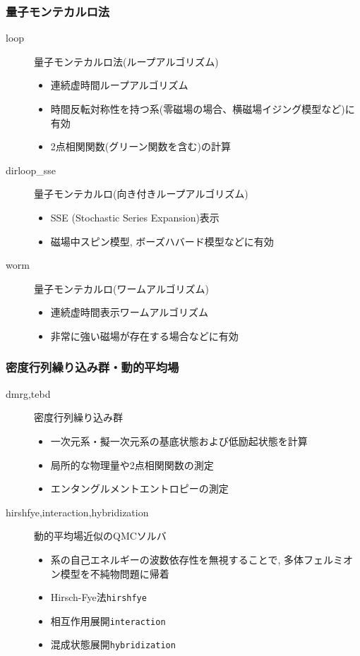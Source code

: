 \begin{frame}
  \frametitle{量子モンテカルロ法}
  \begin{description}
  \item[loop] 量子モンテカルロ法(ループアルゴリズム)
    \begin{itemize}
      \item 連続虚時間ループアルゴリズム
      \item 時間反転対称性を持つ系(零磁場の場合、横磁場イジング模型など)に有効
      \item 2点相関関数(グリーン関数を含む)の計算
    \end{itemize}
  \item[dirloop\_sse] 量子モンテカルロ(向き付きループアルゴリズム)
    \begin{itemize}
      \item SSE (Stochastic Series Expansion)表示
      \item 磁場中スピン模型, ボーズハバード模型などに有効
    \end{itemize}
  \item[worm] 量子モンテカルロ(ワームアルゴリズム)
    \begin{itemize}
      \item 連続虚時間表示ワームアルゴリズム
      \item 非常に強い磁場が存在する場合などに有効
    \end{itemize}
  \end{description}
\end{frame}

\begin{frame}
  \frametitle{密度行列繰り込み群・動的平均場}
  \begin{description}
  \item[dmrg,tebd] 密度行列繰り込み群
    \begin{itemize}
      \item 一次元系・擬一次元系の基底状態および低励起状態を計算
      \item 局所的な物理量や2点相関関数の測定
      \item エンタングルメントエントロピーの測定
    \end{itemize}
  \item[hirshfye,interaction,hybridization] 動的平均場近似のQMCソルバ
    \begin{itemize}
      \item 系の自己エネルギーの波数依存性を無視することで, 多体フェルミオン模型を不純物問題に帰着
      \item Hirsch-Fye法{\tt hirshfye}
      \item 相互作用展開{\tt interaction}
      \item 混成状態展開{\tt hybridization}
    \end{itemize}
  \end{description}
\end{frame}

